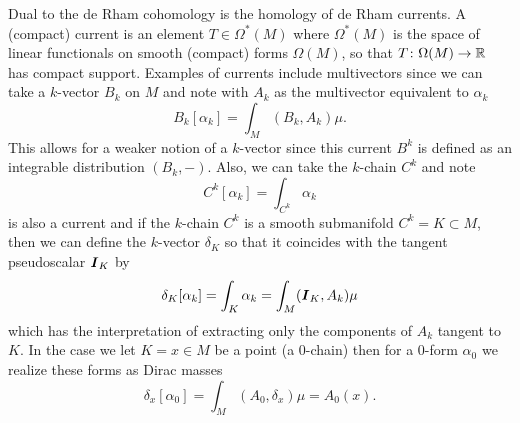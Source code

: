 \documentclass[conf]{new-aiaa}
\begin{document}
Dual to the de Rham cohomology is the homology of de Rham currents. A (compact) current is an element $T\in \Omega^*(M)$ where $\Omega^*(M)$ is the space of linear functionals on smooth (compact) forms $\Omega(M)$, so that $T\colon \Omega(M)\to \mathbb{R}$ has compact support. Examples of currents include multivectors since we can take a $k$-vector $B_{k}$ on $M$ and note with $A_k$ as the multivector equivalent to $\alpha_k$
\begin{equation}
    B_k[\alpha_k] = \int_M (B_k,A_k) \mu.
\end{equation}
This allows for a weaker notion of a $k$-vector since this current $B^k$ is defined as an integrable distribution $(B_k,-)$. Also, we can take the $k$-chain $C^k$ and note
\begin{equation}
    C^k[\alpha_k] = \int_{C^k} \alpha_k
\end{equation}
is also a current and if the $k$-chain $C^k$ is a smooth submanifold $C^k=K\subset M$, then we can define the $k$-vector $\delta_K$ so that it coincides with the tangent pseudoscalar $\boldsymbol{I}_K$ by
\begin{equation}
\delta_K[\alpha_k] = \int_{K} \alpha_k = \int_{M} (\boldsymbol{I}_K, A_k)\mu
\end{equation}
which has the interpretation of extracting only the components of $A_k$ tangent to $K$. In the case we let $K=x\in M$ be a point (a $0$-chain) then for a $0$-form $\alpha_0$ we realize these forms as Dirac masses
\begin{equation}
\delta_x[\alpha_0] = \int_M (A_0,\delta_x) \mu = A_0(x).
\end{equation}
\end{document}
